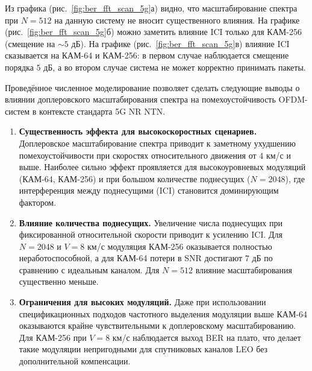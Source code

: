 Из графика (рис.~\ref{fig:ber_fft_scan_5g}а) видно, что масштабирование спектра при $N = 512$ на данную систему не вносит существенного влияния.
На графике (рис.~\ref{fig:ber_fft_scan_5g}б) можно заметить влияние ICI только для КАМ-256 (смещение на $\sim 5$ дБ). 
На графике (рис.~\ref{fig:ber_fft_scan_5g}в) влияние ICI сказывается на КАМ-64 и КАМ-256: в первом случае наблюдается смещение порядка $5$ дБ, а
во втором случае система не может корректно принимать пакеты.

Проведённое численное моделирование позволяет сделать следующие выводы о влиянии доплеровского 
масштабирования спектра на помехо\-устойчивость OFDM-систем в контексте стандарта 5G NR NTN.

\begin{enumerate}
    \item \textbf{Существенность эффекта для высокоскоростных сценариев.} 
    Доплеровское масштабирование спектра приводит к заметному ухудшению помехоустойчивости при 
    скоростях относительного движения от $4$ км/с и выше. Наиболее сильно эффект проявляется для 
    высокоуровневых модуляций (КАМ-64, КАМ-256) и при большом количестве поднесущих ($N=2048$), 
    где интерференция между поднесущими (ICI) становится доминирующим фактором.

    \item \textbf{Влияние количества поднесущих.} 
    Увеличение числа поднесущих при фиксированной относительной скорости приводит к усилению ICI.
    Для $N=2048$ и $V=8$ км/с модуляция КАМ-256 оказывается полностью неработоспособной,
    а для КАМ-64 потери в SNR достигают $7$ дБ по сравнению с идеальным каналом.
    Для $N=512$ влияние масштабирования существенно меньше.

    \item \textbf{Ограничения для высоких модуляций.} 
    Даже при использовании спецификационных подходов частотного выделения модуляции выше КАМ-64 оказываются крайне 
    чувствительными к доплеровскому масштабированию. Для КАМ-256 при $V = 8$ км/с наблюдается выход BER на плато,
     что делает такие модуляции непригодными для спутниковых каналов 
    LEO без дополнительной компенсации.

\end{enumerate}